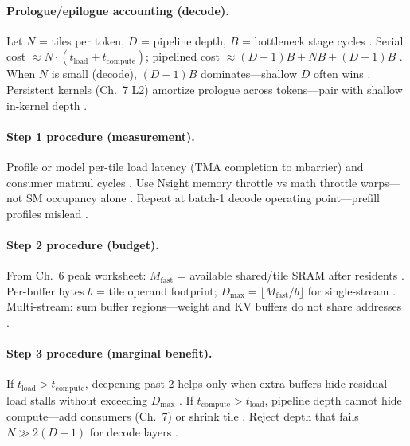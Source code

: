 \paragraph{Prologue/epilogue accounting (decode).}
Let $N$ = tiles per token, $D$ = pipeline depth, $B$ = bottleneck stage cycles \citep{patel2025llminference,dlbook}.
Serial cost $\approx N \cdot (t_{\mathrm{load}} + t_{\mathrm{compute}})$; pipelined cost $\approx (D{-}1)B + N B + (D{-}1)B$ \citep{semianalysis2024tma,dao2022flashattention}.
When $N$ is small (decode), $(D{-}1)B$ dominates---shallow $D$ often wins \citep{memoryfloor2026,taxbreak2026,patel2025llminference}.
Persistent kernels (Ch.~7 L2) amortize prologue across tokens---pair with shallow in-kernel depth \citep{mpk2025,nvidia2024cudagraphs,shah2024flashattention3}.

\paragraph{Step 1 procedure (measurement).}
Profile or model per-tile load latency (TMA completion to mbarrier) and consumer matmul cycles \citep{shah2024flashattention3,patel2025llminference}.
Use Nsight memory throttle vs math throttle warps---not SM occupancy alone \citep{memoryfloor2026,yirage2026}.
Repeat at batch-1 decode operating point---prefill profiles mislead \citep{kwon2023vllm,taxbreak2026}.

\paragraph{Step 2 procedure (budget).}
From Ch.~6 peak worksheet: $M_{\mathrm{fast}}$ = available shared/tile SRAM after residents \citep{yirage2026,dao2022flashattention,chen2020compilerbasedhardw}.
Per-buffer bytes $b$ = tile operand footprint; $D_{\max} = \lfloor M_{\mathrm{fast}} / b \rfloor$ for single-stream \citep{memoryfloor2026,semianalysis2024tma}.
Multi-stream: sum buffer regions---weight and KV buffers do not share addresses \citep{kwon2023vllm,shah2024flashattention3}.

\paragraph{Step 3 procedure (marginal benefit).}
If $t_{\mathrm{load}} > t_{\mathrm{compute}}$, deepening past 2 helps only when extra buffers hide residual load stalls without exceeding $D_{\max}$ \citep{semianalysis2024tma,patel2025llminference}.
If $t_{\mathrm{compute}} > t_{\mathrm{load}}$, pipeline depth cannot hide compute---add consumers (Ch.~7) or shrink tile \citep{shah2024flashattention3,yirage2026}.
Reject depth that fails $N \gg 2(D{-}1)$ for decode layers \citep{taxbreak2026,memoryfloor2026}.

